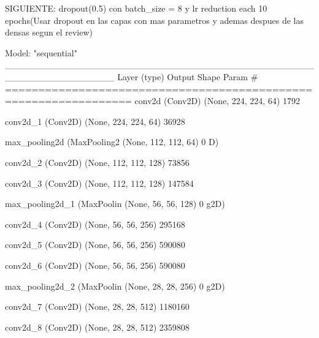\documentclass[11pt, a4paper]{article} %
\begin{document}
SIGUIENTE:  dropout(0.5) con batch_size = 8 y lr reduction each 10 epochs(Usar dropout en las capas con mas parametros y ademas despues de las densas segun el review)

Model: "sequential"
_________________________________________________________________
 Layer (type)                Output Shape              Param #   
=================================================================
 conv2d (Conv2D)             (None, 224, 224, 64)      1792      
                                                                 
 conv2d_1 (Conv2D)           (None, 224, 224, 64)      36928     
                                                                 
 max_pooling2d (MaxPooling2  (None, 112, 112, 64)      0         
 D)                                                              
                                                                 
 conv2d_2 (Conv2D)           (None, 112, 112, 128)     73856     
                                                                 
 conv2d_3 (Conv2D)           (None, 112, 112, 128)     147584    
                                                                 
 max_pooling2d_1 (MaxPoolin  (None, 56, 56, 128)       0         
 g2D)                                                            
                                                                 
 conv2d_4 (Conv2D)           (None, 56, 56, 256)       295168    
                                                                 
 conv2d_5 (Conv2D)           (None, 56, 56, 256)       590080    
                                                                 
 conv2d_6 (Conv2D)           (None, 56, 56, 256)       590080    
                                                                 
 max_pooling2d_2 (MaxPoolin  (None, 28, 28, 256)       0         
 g2D)                                                            
                                                                 
 conv2d_7 (Conv2D)           (None, 28, 28, 512)       1180160   
                                                                 
 conv2d_8 (Conv2D)           (None, 28, 28, 512)       2359808   
                                                                 
\end{document}
